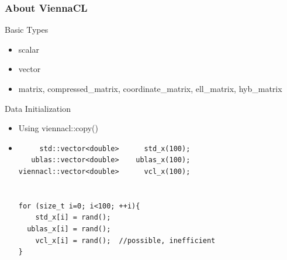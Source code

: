 


\begin{frame}[fragile]
\frametitle{About ViennaCL}

 \begin{block}{Basic Types}
   \begin{itemize}
    \item scalar
    \item vector
    \item matrix, compressed\_matrix, coordinate\_matrix, ell\_matrix, hyb\_matrix
   \end{itemize}
 \end{block}

 \begin{block}{Data Initialization}
    \begin{itemize}
     \item Using viennacl::copy() 
    \item  { \black
  \begin{lstlisting}
     std::vector<double>      std_x(100);
   ublas::vector<double>    ublas_x(100);
viennacl::vector<double>      vcl_x(100);


for (size_t i=0; i<100; ++i){
    std_x[i] = rand();
  ublas_x[i] = rand();
    vcl_x[i] = rand();  //possible, inefficient
}
  \end{lstlisting} }

 \end{itemize}

 \end{block}
\end{frame}



